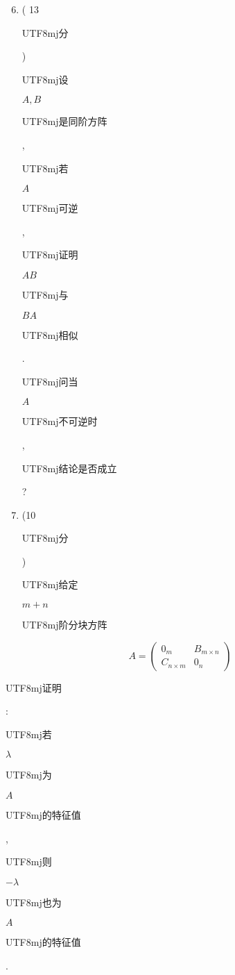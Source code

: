 \documentclass[10pt]{article}
\begin{document}
\begin{enumerate}
  \setcounter{enumi}{5}
  \item ( 13 \begin{CJK}{UTF8}{mj}分\end{CJK}) \begin{CJK}{UTF8}{mj}设\end{CJK} $A, B$ \begin{CJK}{UTF8}{mj}是同阶方阵\end{CJK}, \begin{CJK}{UTF8}{mj}若\end{CJK} $A$ \begin{CJK}{UTF8}{mj}可逆\end{CJK}, \begin{CJK}{UTF8}{mj}证明\end{CJK} $A B$ \begin{CJK}{UTF8}{mj}与\end{CJK} $B A$ \begin{CJK}{UTF8}{mj}相似\end{CJK}. \begin{CJK}{UTF8}{mj}问当\end{CJK} $A$ \begin{CJK}{UTF8}{mj}不可逆时\end{CJK},\begin{CJK}{UTF8}{mj}结论是否成立\end{CJK}?

  \item (10 \begin{CJK}{UTF8}{mj}分\end{CJK}) \begin{CJK}{UTF8}{mj}给定\end{CJK} $m+n$ \begin{CJK}{UTF8}{mj}阶分块方阵\end{CJK}

\end{enumerate}
$$
A=\left(\begin{array}{cc}
0_{m} & B_{m \times n} \\
C_{n \times m} & 0_{n}
\end{array}\right)
$$
\begin{CJK}{UTF8}{mj}证明\end{CJK}: \begin{CJK}{UTF8}{mj}若\end{CJK} $\lambda$ \begin{CJK}{UTF8}{mj}为\end{CJK} $A$ \begin{CJK}{UTF8}{mj}的特征值\end{CJK}, \begin{CJK}{UTF8}{mj}则\end{CJK} $-\lambda$ \begin{CJK}{UTF8}{mj}也为\end{CJK} $A$ \begin{CJK}{UTF8}{mj}的特征值\end{CJK}.
\end{document}
